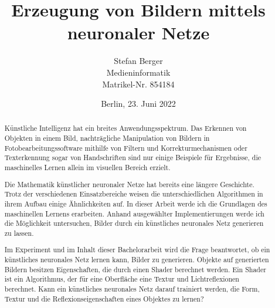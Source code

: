 \titlehead{Berliner Hochschule für Technik Berlin\\Fachbereich VI -- Informatik und Medien}
\subject{Bachelorarbeit}
\title{Erzeugung von Bildern mittels\\neuronaler Netze}
\author{Stefan Berger\\Medieninformatik\\Matrikel-Nr. 854184}
\date{Berlin, 23. Juni 2022}

\publishers{Betreut von: Prof.~Dr.~F.~Gers \\
\bigskip Gutachter: Prof.~Dr.~J.~Schimkat}


\maketitle

\begin{abstract}
\vspace{\baselineskip}
Künstliche Intelligenz hat ein breites Anwendungsspektrum. Das Erkennen von Objekten in einem Bild, nachträgliche Manipulation von Bildern in Fotobearbeitungssoftware mithilfe von Filtern und Korrekturmechanismen oder Texterkennung sogar von Handschriften sind nur einige Beispiele für Ergebnisse, die maschinelles Lernen allein im visuellen Bereich erzielt.

Die Mathematik künstlicher neuronaler Netze hat bereits eine längere Geschichte. Trotz der verschiedenen Einsatzbereiche weisen die unterschiedlichen Algorithmen in ihrem Aufbau einige Ähnlichkeiten auf. In dieser Arbeit werde ich die Grundlagen des maschinellen Lernens erarbeiten. Anhand ausgewählter Implementierungen werde ich die Möglichkeit untersuchen, Bilder durch ein künstliches neuronales Netz generieren zu lassen.

Im Experiment und im Inhalt dieser Bachelorarbeit wird die Frage beantwortet, ob ein künstliches neuronales Netz lernen kann, Bilder zu generieren. Objekte auf generierten Bildern besitzen Eigenschaften, die durch einen Shader berechnet werden. Ein Shader ist ein Algorithmus, der für eine Oberfläche eine Textur und Lichtreflexionen berechnet. Kann ein künstliches neuronales Netz darauf trainiert werden, die Form, Textur und die Reflexionseigenschaften eines Objektes zu lernen?

\end{abstract}
